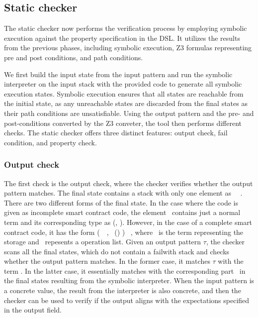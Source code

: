 \documentclass[a4paper,USenglish,cleveref, autoref, thm-restate]{lipics-v2021}
\begin{document}
\subsection{Static checker}
\label{sec:static-checker}
The static checker now performs the verification process by employing symbolic execution against the property specification in the DSL. It utilizes the results from the previous phases, including symbolic execution, Z3 formulas representing pre and post conditions, and path conditions. 

We first build the input state from the input pattern and run the
symbolic interpreter on the input stack with the provided code to
generate all symbolic execution states. Symbolic execution ensures
that all states are reachable from the initial state, as any
unreachable states are discarded from the final states as their path
conditions are unsatisfiable. Using the output pattern and the pre-
and post-conditions converted by the Z3 conveter, the tool then
performs different checks. The static checker offers three distinct
features: output check, fail condition, and property check. 

\subsubsection{Output check}
\label{sec:output-check}
The first check is the output check, where the checker verifies
whether the output pattern matches. The final state contains a stack
with only one element as \Stack\ \STACKCONCAT\ \EMPTYSTACK. There are
two different forms of the final state. In the case where the code is
given as incomplete smart contract code, the element \Stack\ contains
just a normal term and its corresponding type as (\Term,
\TY). However, in the case of a complete smart contract code, it has
the form (\PAIR\ \VOPERATIONLIST\ \VSTORAGE, \TPAIR\ (\TOPERATIONLIST)
\TYS) \STACKCONCAT\ \EMPTYSTACK, where \VSTORAGE\ is the term
representing the storage and \VOPERATIONLIST\ repesents a operation
list. Given an output pattern $ \tau$, the checker scans all the final
states, which do not contain a failwith stack and checks whether the
output pattern matches. In the former case, it matches $ \tau$  with
the term \Term. In the latter case, it essentially matches with the
corresponding part \VSTORAGE\ in the final states resulting from the
symbolic interpreter. When the input pattern is a concrete value, the
result from the interpreter is also concrete, and then the checker can
be used to verify if the output aligns with the expectations
specified in the output field. 
\end{document}
